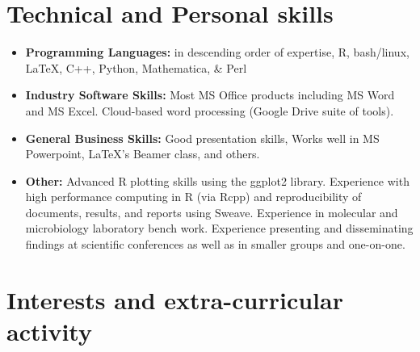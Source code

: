\documentclass[11pt,a4paper,sans]{moderncv}        %
\begin{document}
\section{Technical and Personal skills}

\vspace{6pt}

\begin{itemize}

\item \textbf{Programming Languages:} in descending order of expertise, R, bash/linux, \LaTeX, C++, Python, Mathematica, \& Perl 

\vspace{6pt}

\item \textbf{Industry Software Skills:} Most MS Office products including MS Word and MS Excel. Cloud-based word processing (Google Drive suite of tools).

\vspace{6pt}

\item \textbf{General Business Skills:} Good presentation skills, Works well in MS Powerpoint, \LaTeX's Beamer class, and others. 

\vspace{6pt}

\item \textbf{Other:} Advanced R plotting skills using the ggplot2 library. Experience with high performance computing in R (via Rcpp) and reproducibility of documents, results, and reports using Sweave.  Experience in molecular and microbiology laboratory bench work. Experience presenting and disseminating findings at scientific conferences as well as in smaller groups and one-on-one. 

\end{itemize}

\section{Interests and extra-curricular activity}

\vspace{6pt}
\end{document}

